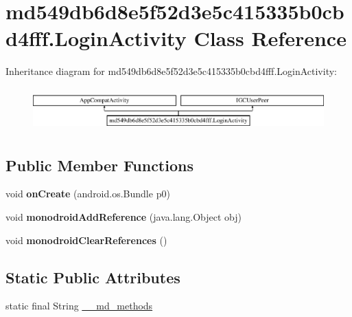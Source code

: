 \hypertarget{classmd549db6d8e5f52d3e5c415335b0cbd4fff_1_1_login_activity}{}\section{md549db6d8e5f52d3e5c415335b0cbd4fff.\+Login\+Activity Class Reference}
\label{classmd549db6d8e5f52d3e5c415335b0cbd4fff_1_1_login_activity}
Inheritance diagram for md549db6d8e5f52d3e5c415335b0cbd4fff.\+Login\+Activity\+:\begin{figure}[H]
\begin{center}
\leavevmode
\includegraphics[height=1.686747cm]{classmd549db6d8e5f52d3e5c415335b0cbd4fff_1_1_login_activity}
\end{center}
\end{figure}
\subsection*{Public Member Functions}
\begin{DoxyCompactItemize}
\item 
\mbox{\label{classmd549db6d8e5f52d3e5c415335b0cbd4fff_1_1_login_activity_ac659e2e175404559be098de7e83ed4c1}} 
void {\bfseries on\+Create} (android.\+os.\+Bundle p0)
\item 
\mbox{\label{classmd549db6d8e5f52d3e5c415335b0cbd4fff_1_1_login_activity_afa80171c996e71d1811770e4909e9d5a}} 
void {\bfseries monodroid\+Add\+Reference} (java.\+lang.\+Object obj)
\item 
\mbox{\label{classmd549db6d8e5f52d3e5c415335b0cbd4fff_1_1_login_activity_abe01e30eddb354a0474f99fe93cc9ac2}} 
void {\bfseries monodroid\+Clear\+References} ()
\end{DoxyCompactItemize}
\subsection*{Static Public Attributes}
\begin{DoxyCompactItemize}
\item 
static final String \hyperlink{classmd549db6d8e5f52d3e5c415335b0cbd4fff_1_1_login_activity_a0b3776ea9c20482f6987b8e37b057b92}{\+\_\+\+\_\+md\+\_\+methods}
\end{DoxyCompactItemize}


